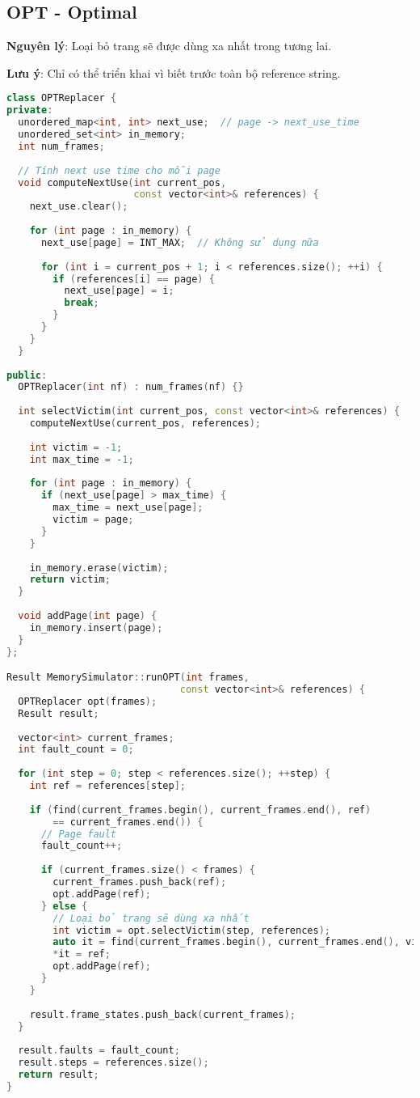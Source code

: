 \subsection{OPT - Optimal}

\textbf{Nguyên lý}: Loại bỏ trang sẽ được dùng xa nhất trong tương lai.

\textbf{Lưu ý}: Chỉ có thể triển khai vì biết trước toàn bộ reference string.

\begin{lstlisting}[language=C++,caption={OPT Page Replacement}]
class OPTReplacer {
private:
  unordered_map<int, int> next_use;  // page -> next_use_time
  unordered_set<int> in_memory;
  int num_frames;
  
  // Tính next use time cho mỗi page
  void computeNextUse(int current_pos, 
                      const vector<int>& references) {
    next_use.clear();
    
    for (int page : in_memory) {
      next_use[page] = INT_MAX;  // Không sử dụng nữa
      
      for (int i = current_pos + 1; i < references.size(); ++i) {
        if (references[i] == page) {
          next_use[page] = i;
          break;
        }
      }
    }
  }
  
public:
  OPTReplacer(int nf) : num_frames(nf) {}
  
  int selectVictim(int current_pos, const vector<int>& references) {
    computeNextUse(current_pos, references);
    
    int victim = -1;
    int max_time = -1;
    
    for (int page : in_memory) {
      if (next_use[page] > max_time) {
        max_time = next_use[page];
        victim = page;
      }
    }
    
    in_memory.erase(victim);
    return victim;
  }
  
  void addPage(int page) {
    in_memory.insert(page);
  }
};

Result MemorySimulator::runOPT(int frames, 
                              const vector<int>& references) {
  OPTReplacer opt(frames);
  Result result;
  
  vector<int> current_frames;
  int fault_count = 0;
  
  for (int step = 0; step < references.size(); ++step) {
    int ref = references[step];
    
    if (find(current_frames.begin(), current_frames.end(), ref) 
        == current_frames.end()) {
      // Page fault
      fault_count++;
      
      if (current_frames.size() < frames) {
        current_frames.push_back(ref);
        opt.addPage(ref);
      } else {
        // Loại bỏ trang sẽ dùng xa nhất
        int victim = opt.selectVictim(step, references);
        auto it = find(current_frames.begin(), current_frames.end(), victim);
        *it = ref;
        opt.addPage(ref);
      }
    }
    
    result.frame_states.push_back(current_frames);
  }
  
  result.faults = fault_count;
  result.steps = references.size();
  return result;
}
\end{lstlisting}

